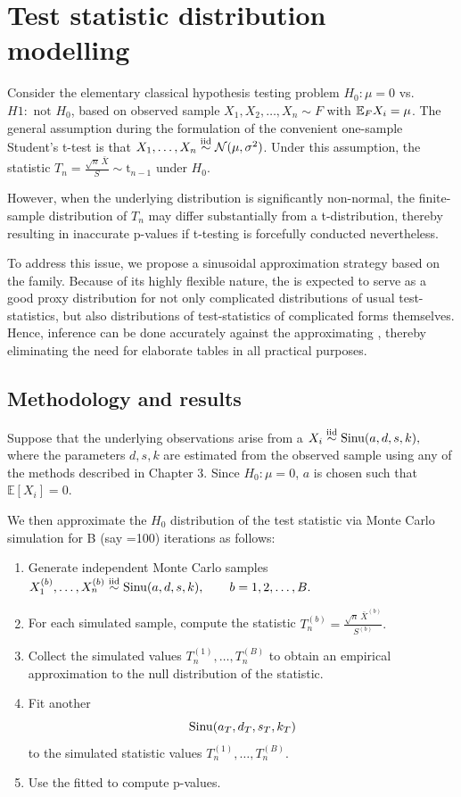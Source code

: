 \section{Test statistic distribution modelling}
Consider the elementary classical hypothesis testing problem $H_0 : \mu = 0$ vs. $H1: \text{ not }H_0$, based on observed sample $X_1, X_2, \dots, X_n \sim F$ with $\mathbb E_F X_i = \mu$. The general assumption during the formulation of the convenient one-sample Student's t-test is that $X_1, \dots, X_n \overset{\text{iid}}{\sim} \mathcal{N} (\mu, \sigma^2)$. Under this assumption, the statistic $T_n = \frac{\sqrt{n}\,\bar X}{S} \sim \mathrm t_{n-1}$ under $H_0$.

However, when the underlying distribution is significantly non-normal, the finite-sample distribution of $T_n$ may differ substantially from a t-distribution, thereby resulting in inaccurate p-values if t-testing is forcefully conducted nevertheless.

To address this issue, we propose a sinusoidal approximation strategy based on the \sindist{} family. Because of its highly flexible nature, the \sindist{} is expected to serve as a good proxy distribution for not only complicated distributions of usual test-statistics, but also distributions of test-statistics of complicated forms themselves. Hence, inference can be done accurately against the approximating \sindist, thereby eliminating the need for elaborate tables in all practical purposes.

\subsection{Methodology and results}
Suppose that the underlying observations arise from a \sindist{}
\(
X_i
\overset{\text{iid}}{\sim}
\operatorname*{Sinu}(a,d,s,k),
\)
where the parameters $d,s,k$ are estimated from the observed sample using any of the methods described in Chapter 3. Since $H_0: \mu =0 $, $a$ is chosen such that $\mathbb E[X_i] = 0$.

We then approximate the $H_0$ distribution of the test statistic via Monte Carlo simulation for B (say =100) iterations as follows:
\begin{enumerate}
	\item Generate independent Monte Carlo samples
	\(
	X_1^{(b)},\dots,X_n^{(b)}
	\overset{\text{iid}}{\sim}
	\operatorname*{Sinu}(a,d,s,k),
	\qquad
	b=1,2,\dots,B.
	\)
	\item For each simulated sample, compute the statistic
	\(
	T_n^{(b)}
	=
	\frac{
		\sqrt{n}\,\bar X^{(b)}
	}{
		S^{(b)}
	}.
	\)
	\item Collect the simulated values $T_n^{(1)},\dots,T_n^{(B)}$ to obtain an empirical approximation to the null distribution of the statistic.
	\item Fit another \sindist{}
	\[
	\operatorname*{Sinu}(a_T,d_T,s_T,k_T)
	\]
	to the simulated statistic values $T_n^{(1)},\dots,T_n^{(B)}$.
	\item Use the fitted \sindist{} to compute p-values.
\end{enumerate}

